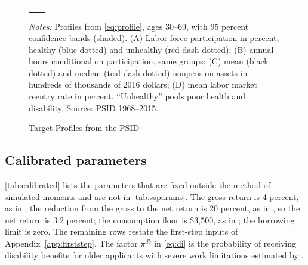 \begin{figure}[!htbp]
\centering
\caption{Target Profiles from the PSID}
\label{fig:targets}
\vspace{6pt}
\begin{tabular}{cc}
 & \\[1.5ex]
 & 
\end{tabular}
\begin{minipage}{0.95\textwidth}\footnotesize{}
\textit{Notes:} Profiles from \eqref{eq:profile}, ages 30--69, with 95 percent confidence bands (shaded). (A) Labor force participation in percent, healthy (blue dotted) and unhealthy (red dash-dotted); (B) annual hours conditional on participation, same groups; (C) mean (black dotted) and median (teal dash-dotted) nonpension assets in hundreds of thousands of 2016 dollars; (D) mean labor market reentry rate in percent. ``Unhealthy'' pools poor health and disability. Source: PSID 1968--2015.
\end{minipage}
\end{figure}

\subsection{Calibrated parameters}\label{app:calibrated}

\autoref{tab:calibrated} lists the parameters that are fixed outside the method of simulated moments and are not in \autoref{tab:ssparams}. The gross return is 4 percent, as in \citet{french2005effects}; the reduction from the gross to the net return is 20 percent, as in \citet{Stantcheva2017}, so the net return is 3.2 percent; the consumption floor is \$3,500, as in \citet{french2011effects}; the borrowing limit is zero. %
The remaining rows restate the first-step inputs of Appendix~\ref{app:firststep}. The factor $\pi^{db}$ in \eqref{eq:di} is the probability of receiving disability benefits for older applicants with severe work limitations estimated by \citet{Low2015}. %

